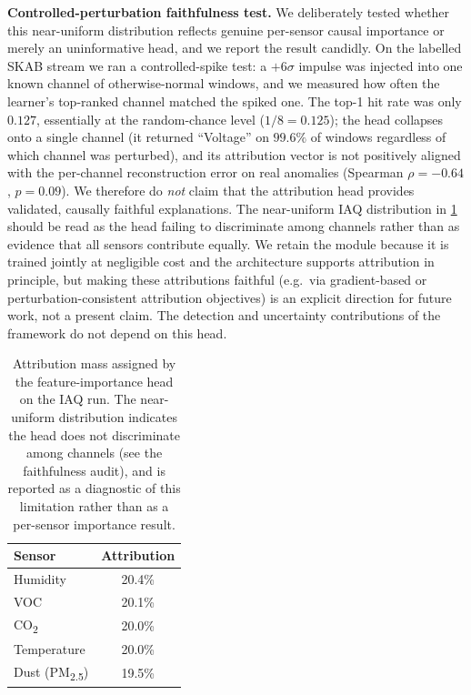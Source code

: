 \textbf{Controlled-perturbation faithfulness test.} We deliberately tested whether this near-uniform distribution reflects genuine per-sensor causal importance or merely an uninformative head, and we report the result candidly. On the labelled SKAB stream we ran a controlled-spike test: a $+6\sigma$ impulse was injected into one known channel of otherwise-normal windows, and we measured how often the learner's top-ranked channel matched the spiked one. The top-1 hit rate was only $0.127$, essentially at the random-chance level ($1/8 = 0.125$); the head collapses onto a single channel (it returned ``Voltage'' on $99.6\%$ of windows regardless of which channel was perturbed), and its attribution vector is not positively aligned with the per-channel reconstruction error on real anomalies (Spearman $\rho = -0.64$, $p = 0.09$). We therefore do \emph{not} claim that the attribution head provides validated, causally faithful explanations. The near-uniform IAQ distribution in \cref{table:attribution} should be read as the head failing to discriminate among channels rather than as evidence that all sensors contribute equally. We retain the module because it is trained jointly at negligible cost and the architecture supports attribution in principle, but making these attributions faithful (e.g.\ via gradient-based or perturbation-consistent attribution objectives) is an explicit direction for future work, not a present claim. The detection and uncertainty contributions of the framework do not depend on this head.

\begin{table}[H]
\centering
\caption{Attribution mass assigned by the feature-importance head on the IAQ run. The near-uniform distribution indicates the head does not discriminate among channels (see the faithfulness audit), and is reported as a diagnostic of this limitation rather than as a per-sensor importance result.}
\label{table:attribution}
\begin{tabular}{lc}
\toprule
\textbf{Sensor} & \textbf{Attribution} \\
\midrule
Humidity & 20.4\% \\
VOC & 20.1\% \\
CO\textsubscript{2} & 20.0\% \\
Temperature & 20.0\% \\
Dust (PM\textsubscript{2.5}) & 19.5\% \\
\bottomrule
\end{tabular}
\end{table}

